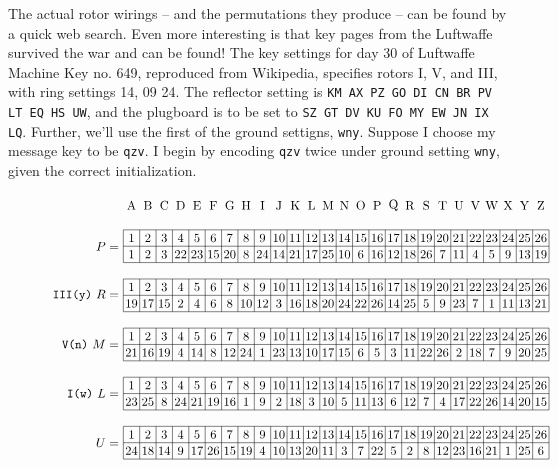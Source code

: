 \documentclass[m3380-lec-main.tex]{subfiles}
\begin{document}
\begin{exmp} The actual rotor wirings -- and the permutations they produce -- can be found by a quick web search. Even more interesting  is that key pages from the Luftwaffe survived the war and can be found! The key settings for day 30 of Luftwaffe Machine Key no. 649, reproduced from Wikipedia, specifies rotors I, V, and III, with ring settings 14, 09 24. The reflector setting is \texttt{KM AX PZ GO DI CN BR PV LT EQ HS UW}, and the plugboard is to be set to \texttt{SZ GT DV KU FO MY EW JN IX LQ}. Further, we'll use the first of the ground settigns, \verb|wny|. Suppose I choose my message key to be \verb|qzv|. I begin by encoding \verb|qzv| twice under ground setting \verb|wny|, given the correct initialization. 

\begin{figure}[hbt]{\tiny
\[\begin{tikzpicture}[scale = 12/26]
\draw \foreach \x/\c in {1/A, 2/B, 3/C, 4/D, 5/E, 6/F, 7/G, 8/H, 9/I, 10/J, 11/K, 12/L, 13/M, 14/N, 15/O, 16/P, 17/Q, 18/R, 19/S, 20/T, 21/U, 22/V, 23/W, 24/X, 25/Y, 26/Z}{ (\x-0.5,0.5) node {\c}};
\draw (0,-2) node [left] {$P=$};
\draw (0, -5) node [left] {\texttt{III(y)}~$R=$};
\draw (0, -8) node [left] {\texttt{V(n)}~$M=$};
\draw (0,-11) node [left] {\texttt{I(w)}~$L=$};
\draw (0,-14) node [left] {$U=$};
%
\draw (0,-3) grid (26,-1)
	\foreach \x in {1,...,26}{(\x-0.5,-1.5) node {\x}}
	\foreach \x/\c in {1/1, 2/2, 3/3, 4/22, 5/23, 6/15, 7/20, 8/8, 9/24, 10/14, 11/21, 12/17, 13/25, 14/10, 15/6, 16/16, 17/12, 18/18, 19/26, 20/7, 21/11, 22/4, 23/5, 24/9, 25/13, 26/19}{(\x-0.5,-2.5) node {\c}};
\draw (0,-6) grid (26,-4)
	\foreach \x in {1,...,26}{(\x-0.5,-4.5) node {\x}}
	\foreach \x/\c in {1/19, 2/17, 3/15, 4/2, 5/4, 6/6, 7/8, 8/10, 9/12, 10/3, 11/16, 12/18, 13/20, 14/24, 15/22, 16/26, 17/14, 18/25, 19/5, 20/9, 21/23, 22/7, 23/1, 24/11, 25/13, 26/21}{(\x-0.5,-5.5) node {\c}};
\draw (0,-9) grid (26,-7)
	\foreach \x in {1,...,26}{(\x-0.5,-7.5) node {\x}}
	\foreach \x/\c in {1/21, 2/16, 3/19, 4/4, 5/14, 6/8, 7/12, 8/24, 9/1, 10/23, 11/13, 12/10, 13/17, 14/15, 15/6, 16/5, 17/3, 18/11, 19/22, 20/26, 21/2, 22/18, 23/7, 24/9, 25/20, 26/25}{(\x-0.5,-8.5) node {\c}};
\draw (0,-12) grid (26,-10)
	\foreach \x in {1,...,26}{(\x-0.5,-10.5) node {\x}}
	\foreach \x/\c in {1/23, 2/25, 3/8, 4/24, 5/21, 6/19, 7/16, 8/1, 9/9, 10/2, 11/18, 12/3, 13/10, 14/5, 15/11, 16/13, 17/6, 18/12, 19/7, 20/4, 21/17, 22/22, 23/26, 24/14, 25/20, 26/15}{(\x-0.5,-11.5) node {\c}};
\draw (0,-15) grid (26,-13)
	\foreach \x in {1,...,26}{(\x-0.5,-13.5) node {\x}}
	\foreach \x/\c in {1/24, 2/18, 3/14, 4/9, 5/17, 6/26, 7/15, 8/19, 9/4, 10/10, 11/13, 12/20, 13/11, 14/3, 15/7, 16/22, 17/5, 18/2, 19/8, 20/12, 21/23, 22/16, 23/21, 24/1, 25/25, 26/6}{(\x-0.5,-14.5) node {\c}};

\end{tikzpicture}\]}
\end{figure}
\end{exmp}
\end{document}
